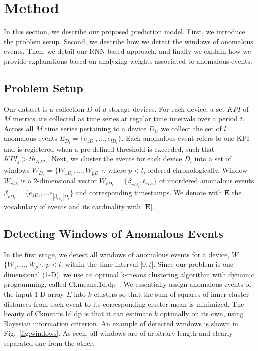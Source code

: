 \documentclass[letterpaper]{article} %
\begin{document}
\section{Method}

In this section, we describe our proposed prediction model. First, we introduce the problem setup. Second, we describe how we detect the windows of anomalous events. Then, we detail our RNN-based approach, and finally we explain how we provide explanations based on analyzing weights associated to anomalous events.

\subsection{Problem Setup}
Our dataset is a collection $D$ of $d$ storage devices. For each device, a set $KPI$ of $M$ metrics are collected as time series at regular time intervals over a period $t$. Across all $M$ time series pertaining to a device $D_{i}$, we collect the set of $l$ anomalous events $E_{D_{i}}=\{{e_{1D_{i}}, ..., e_{lD_{i}}}\}$. Each anomalous event refers to one KPI and is registered when a pre-defined threshold is exceeded, such that $KPI_{j} > th_{KPI_{j}}$. Next, we cluster the events for each device $D_{i}$ into a set of windows $W_{D_{i}}$ = $\{W_{1D_{i}}, ..., W_{pD_{i}}\}$, where $p < l$, ordered chronologically. Window $W_{rD_{i}}$ is a 2-dimensional vector $W_{rD_{i}}$ = $\{\beta_{rD_{i}}, t_{rD_{i}}\}$ of unordered anomalous events $\beta_{rD_{i}} = \{e_{1D_{i}},... e_{|\beta_{rD_{i}}|D_{i}}\}$ and corresponding timestamps. We denote with $\mathbf{E}$ the vocabulary of events and its cardinality with $|\mathbf{E}|$.


\subsection{Detecting Windows of Anomalous Events}
In the first stage, we detect all windows of anomalous events for a device, $W$ = $\{W_{1}, ..., W_{p}\}$, $p < l$, within the time interval [$0, t$]. Since our problem is one-dimensional (1-D), we use an optimal k-means clustering algorithm with dynamic programming, called Ckmeans.1d.dp~\cite{ckmeans}. We essentially assign anomalous events of the input 1-D array $E$ into $k$ clusters so that the sum of squares of inner-cluster distances from each event to its corresponding cluster mean is minimized. The beauty of Ckmeans.1d.dp is that it can estimate $k$ optimally on its own, using Bayesian information criterion. An example of detected windows is shown in Fig.~\ref{fig:windows}. As seen, all windows are of arbitrary length and clearly separated one from the other.
\end{document}
